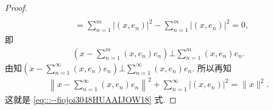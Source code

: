 \documentclass[../../main.tex]{subfiles}%
\begin{document}
\begin{proof}
\begin{align*}
\\
&=\sum_{n=1}^m{\left| \left( x,e_n \right) \right|^2}-\sum_{n=1}^m{\left| \left( x,e_n \right) \right|^2}=0,
\end{align*}
即
\begin{align*}
\left( x-\sum_{n=1}^m{(x,e_n)e_n} \right) \bot \sum_{n=1}^m{(x,e_n)e_n}.
\end{align*}
由知$\left( x-\sum_{n=1}^{\infty}{(x,e_n)e_n} \right) \bot \sum_{n=1}^{\infty}{(x,e_n)e_n}$.
所以再知
\begin{align*}
\left\|x-\sum\limits_{n=1}^\infty(x,e_n)e_n\right\|^2+\sum\limits_{n=1}^\infty|(x,e_n)|^2=\|x\|^2.
\end{align*}
这就是 \eqref{eq:::--fiojoi3048HUAAIJOW18} 式.
\end{proof}
\end{document}
